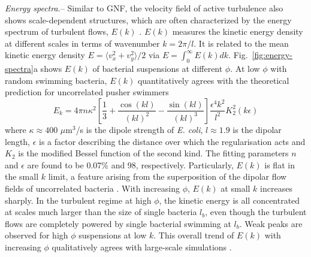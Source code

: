 \documentclass[twocolumn,aps,prl,amsmath,amssymb,longbibliography]{revtex4-2}
\begin{document}
\textit{Energy spectra.}--
Similar to GNF, the velocity field of active turbulence also shows scale-dependent structures, which are often characterized by the energy spectrum of turbulent flows, $E(k)$ \cite{Liu2020}. $E(k)$ measures the kinetic energy density at different scales in terms of wavenumber $k = 2\pi/l$. It is related to the mean kinetic energy density $E = \langle v_x^2 + v_y^2 \rangle/2$ via $E = \int_0^\infty E(k)dk$. Fig.~\ref{fig:energy-spectra}a shows $E(k)$ of bacterial suspensions at different $\phi$.
At low $\phi$ with random swimming bacteria, $E(k)$ quantitatively agrees with the theoretical prediction for uncorrelated pusher swimmers \cite{Bardfalvy2019}
\begin{equation}
E_k = 4\pi n \kappa^2 \left[ \frac{1}{3} + \frac{\cos(kl)}{(kl)^2} - \frac{\sin(kl)}{(kl)^3} \right] \frac{\epsilon^4k^2}{l^2} K_2^2(k\epsilon)
\end{equation}
where  $\kappa \approx 400$ $\mu$m$^3$/s is the dipole strength of \textit{E. coli}, $l\approx 1.9$ is the dipolar length, $\epsilon$ is a factor describing the distance over which the regularisation acts and $K_2$ is the modified Bessel function of the second kind. The fitting parameters $n$ and $\epsilon$ are found to be 0.07\% and 98, respectively.
Particularly, $E(k)$ is flat in the small $k$ limit, a feature arising from the superposition of the dipolar flow fields of uncorrelated bacteria \cite{Bardfalvy2019}.
With increasing $\phi$, $E(k)$ at small $k$ increases sharply. In the turbulent regime at high $\phi$, the kinetic energy is all concentrated at scales much larger than the size of single bacteria $l_b$, even though the turbulent flows are completely powered by single bacterial swimming at $l_b$.
Weak peaks are observed for high $\phi$ suspensions at low $k$. This overall trend of $E(k)$ with increasing $\phi$ qualitatively agrees with large-scale simulations \cite{Saintillan2012,Bardfalvy2019}.
\end{document}
